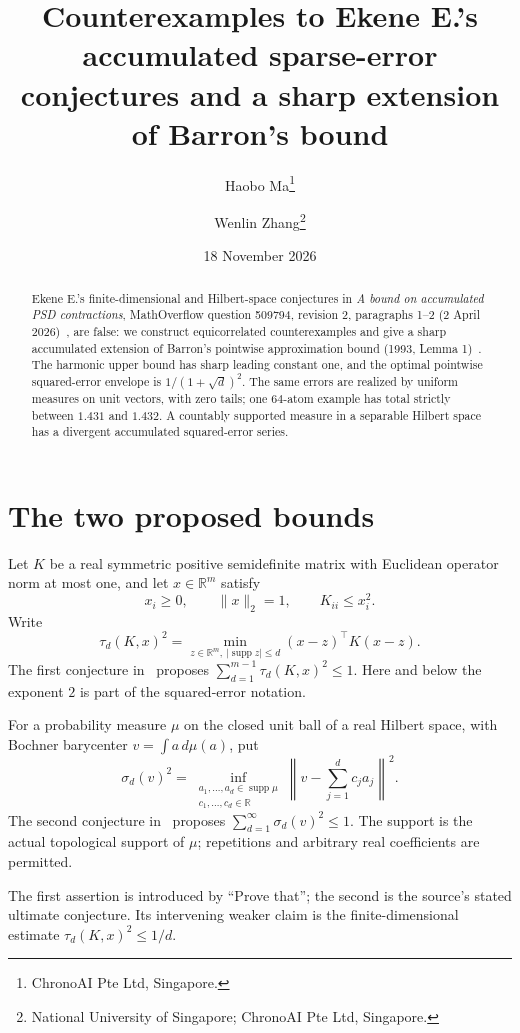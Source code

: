 \documentclass[11pt]{article}
\title{Counterexamples to Ekene E.'s accumulated sparse-error conjectures and a sharp extension of Barron's bound}
\author{Haobo Ma\thanks{ChronoAI Pte Ltd, Singapore.}\and
Wenlin Zhang\thanks{National University of Singapore; ChronoAI Pte Ltd, Singapore.}}
\date{18 November 2026}
\newcommand{\R}{\mathbb R}
\newcommand{\supp}{\operatorname{supp}}
\begin{document}
\maketitle
\begin{abstract}
Ekene E.'s finite-dimensional and Hilbert-space conjectures in
\emph{A bound on accumulated PSD contractions}, MathOverflow question 509794,
revision 2, paragraphs 1--2 (2 April 2026)~\cite{ekene}, are false:
we construct equicorrelated counterexamples and give a sharp accumulated
extension of Barron's pointwise approximation bound (1993, Lemma 1)~\cite{barron1993}.
The harmonic upper bound has sharp leading constant one, and the optimal
pointwise squared-error envelope is $1/(1+\sqrt d)^2$.
The same errors are realized by uniform measures on unit vectors, with zero
tails; one $64$-atom example has total strictly between $1.431$ and $1.432$.
A countably supported measure in a separable Hilbert space has a divergent
accumulated squared-error series.
\end{abstract}

\section{The two proposed bounds}
Let $K$ be a real symmetric positive semidefinite matrix with Euclidean
operator norm at most one, and let $x\in\R^m$ satisfy
\begin{equation}\label{eq:hyp}
 x_i\geq0,\qquad \|x\|_2=1,\qquad K_{ii}\leq x_i^2.
\end{equation}
Write
\[
 \tau_d(K,x)^2=
 \min_{z\in\R^m,\ |\supp z|\leq d}(x-z)^\top K(x-z).
\]
The first conjecture in~\cite[paragraph 1]{ekene} proposes
$\sum_{d=1}^{m-1}\tau_d(K,x)^2\leq1$.
Here and below the exponent $2$ is part of the squared-error notation.

For a probability measure $\mu$ on the closed unit ball of a real Hilbert
space, with Bochner barycenter $v=\int a\,d\mu(a)$, put
\[
\sigma_d(v)^2=
 \inf_{\substack{a_1,\ldots,a_d\in\supp\mu\\c_1,\ldots,c_d\in\R}}
 \left\|v-\sum_{j=1}^d c_j a_j\right\|^2.
\]
The second conjecture in~\cite[paragraph 2]{ekene} proposes
$\sum_{d=1}^{\infty}\sigma_d(v)^2\leq1$.
The support is the actual topological support of $\mu$; repetitions and
arbitrary real coefficients are permitted.

The first assertion is introduced by ``Prove that''; the second is the
source's stated ultimate conjecture. Its intervening weaker claim is the
finite-dimensional estimate $\tau_d(K,x)^2\leq1/d$.
\end{document}
